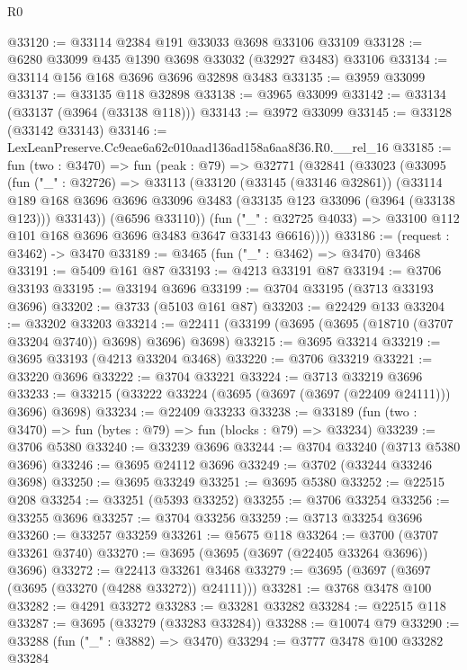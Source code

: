 \begin{lexlean}{R0}
\begin{coremodule}
@33120 := @33114 @2384 @191 @33033 @3698 @33106 @33109
@33128 := @6280 @33099 @435 @1390 @3698 @33032 (@32927 @3483) @33106
@33134 := @33114 @156 @168 @3696 @3696 @32898 @3483
@33135 := @3959 @33099
@33137 := @33135 @118 @32898
@33138 := @3965 @33099
@33142 := @33134 (@33137 (@3964 (@33138 @118)))
@33143 := @3972 @33099
@33145 := @33128 (@33142 @33143)
@33146 := LexLeanPreserve.Cc9eae6a62c010aad136ad158a6aa8f36.R0.__rel_16
@33185 := fun (two : @3470) =>
  fun (peak : @79) =>
  @32771
    (@32841
      (@33023
        (@33095
          (fun ("_" : @32726) =>
          @33113
            (@33120
              (@33145 (@33146 @32861))
              (@33114
                @189
                @168
                @3696
                @3696
                @33096
                @3483
                (@33135 @123 @33096 (@3964 (@33138 @123)))
                @33143))
            (@6596 @33110))
          (fun ("_" : @32725 @4033) =>
          @33100 @112 @101 @168 @3696 @3696 @3483 @3647 @33143 @6616))))
@33186 := (request : @3462) -> @3470
@33189 := @3465 (fun ("_" : @3462) => @3470) @3468
@33191 := @5409 @161 @87
@33193 := @4213 @33191 @87
@33194 := @3706 @33193
@33195 := @33194 @3696
@33199 := @3704 @33195 (@3713 @33193 @3696)
@33202 := @3733 (@5103 @161 @87)
@33203 := @22429 @133
@33204 := @33202 @33203
@33214 := @22411 (@33199 (@3695 (@3695 (@18710 (@3707 @33204 @3740)) @3698) @3696) @3698)
@33215 := @3695 @33214
@33219 := @3695 @33193 (@4213 @33204 @3468)
@33220 := @3706 @33219
@33221 := @33220 @3696
@33222 := @3704 @33221
@33224 := @3713 @33219 @3696
@33233 := @33215 (@33222 @33224 (@3695 (@3697 (@3697 (@22409 @24111))) @3696) @3698)
@33234 := @22409 @33233
@33238 := @33189 (fun (two : @3470) => fun (bytes : @79) => fun (blocks : @79) => @33234)
@33239 := @3706 @5380
@33240 := @33239 @3696
@33244 := @3704 @33240 (@3713 @5380 @3696)
@33246 := @3695 @24112 @3696
@33249 := @3702 (@33244 @33246 @3698)
@33250 := @3695 @33249
@33251 := @3695 @5380
@33252 := @22515 @208
@33254 := @33251 (@5393 @33252)
@33255 := @3706 @33254
@33256 := @33255 @3696
@33257 := @3704 @33256
@33259 := @3713 @33254 @3696
@33260 := @33257 @33259
@33261 := @5675 @118
@33264 := @3700 (@3707 @33261 @3740)
@33270 := @3695 (@3695 (@3697 (@22405 @33264 @3696)) @3696)
@33272 := @22413 @33261 @3468
@33279 := @3695 (@3697 (@3697 (@3695 (@33270 (@4288 @33272)) @24111)))
@33281 := @3768 @3478 @100
@33282 := @4291 @33272
@33283 := @33281 @33282
@33284 := @22515 @118
@33287 := @3695 (@33279 (@33283 @33284))
@33288 := @10074 @79
@33290 := @33288 (fun ("_" : @3882) => @3470)
@33294 := @3777 @3478 @100 @33282 @33284

\end{coremodule}
\end{lexlean}
